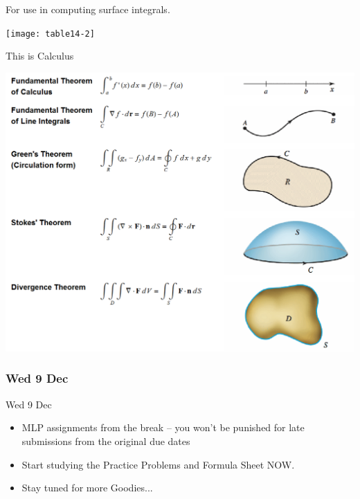 \documentclass[12pt]{beamer}
\theoremstyle{plain}
\theoremstyle{definition}
\begin{document}
% 
\begin{frame}
\begin{center}
For use in computing surface integrals.
\vspace{0.5pc}

\texttt{[image: table14-2]}
\end{center}
\end{frame}

% 
\begin{frame}
\begin{center}
This is Calculus
\vspace{0.5pc}

\includegraphics[scale=.5]{fundamentalTheorems}
\end{center}
\end{frame}

\subsubsection{Wed 9 Dec}
\begin{frame}{Wed 9 Dec}%
\begin{itemize}
\item MLP assignments from the break -- you won't be punished for late submissions from the original due dates 
\item Start studying the Practice Problems and Formula Sheet NOW.
\item Stay tuned for more Goodies...
\end{itemize}
\end{frame}
\end{document}
